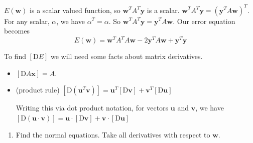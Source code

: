 \documentclass[12pt,letterpaper,noanswers]{exam}
\newcommand{\vc}[1]{\boldsymbol{#1}}
\begin{document}
\begin{tcolorbox}
    $E(\vc{w})$ is a scalar valued function, so $\vc{w}^TA^T\vc{y}$ is a scalar.  $\vc{w}^TA^T\vc{y}=(\vc{y}^TA\vc{w})^T$.  For any scalar, $\alpha$, we have $\alpha^T = \alpha$.  So $\vc{w}^TA^T\vc{y} = \vc{y}^TA\vc{w}$.  Our error equation becomes
    \[E(\vc{w}) = \vc{w}^TA^TA\vc{w}-2\vc{y}^TA\vc{w} + \vc{y}^T\vc{y}\]
    
To find $\left[\text{D}E\right]$ we will need some facts about matrix derivatives.
\begin{itemize}
\itemsep0pt
    \item $\left[\text{D} A\vc{x}\right] = A$.
    \item (product rule) $\left[\text{D}\left(\vc{u}^T\vc{v}\right)\right]= \vc{u}^T\left[\text{D}\vc{v}\right]+\vc{v}^T\left[\text{D}\vc{u}\right]$
    
    Writing this via dot product notation, for vectors $\vc{u}$ and $\vc{v}$, we have $\left[\text{D}\left(\vc{u}\cdot\vc{v}\right)\right]= \vc{u}\cdot\left[\text{D}\vc{v}\right]+\vc{v}\cdot\left[\text{D}\vc{u}\right]$
\end{itemize}
\end{tcolorbox}

\begin{enumerate}[resume=classQ]
    \item Find the normal equations.  Take all derivatives with respect to $\vc{w}$.
\end{enumerate}  
  
 
  
\end{document}
